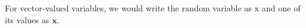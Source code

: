 For vector-valued variables, we would write the random variable as $\bm{\mathrm{x}}$ and one of its values as $\bm{x}$.

